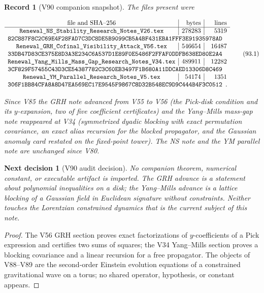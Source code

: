 \documentclass[11pt]{article}
\newtheorem{decision}[theorem]{Next decision}
\newtheorem{record}[theorem]{Record}
\theoremstyle{remark}
\begin{document}
\begin{record}[V90 companion snapshot]
\label{rec:v19v90-snapshot}
The files present were

\[
\begin{array}{c|r|r}
\hbox{file and SHA--256}&\hbox{bytes}&\hbox{lines}\\ \hline
\texttt{Renewal\_NS\_Stability\_Research\_Notes\_V26.tex}
&278283&5319\\
\multicolumn{3}{l}{
\texttt{82C887F8C2C69E4F28FAD7C3DC8DE5B9099CB5A4BF431EBA1FFF3E91935978AD}}
\\
\texttt{Renewal\_GRH\_Cofinal\_Visibility\_Attack\_V56.tex}
&546654&16487\\
\multicolumn{3}{l}{
\texttt{33DB47D83CE375E8D3A3E234C6A537D1E89F0E5486F2FFAF0DDFB638ED80E2A4}}
\\
\texttt{Renewal\_Yang\_Mills\_Mass\_Gap\_Research\_Notes\_V34.tex}
&489911&12282\\
\multicolumn{3}{l}{
\texttt{3CF829F57455C43D3CE54387782C3C60EB3497F1B680A11DDCAED13306D8C469}}
\\
\texttt{Renewal\_YM\_Parallel\_Research\_Notes\_V5.tex}
&54174&1351\\
\multicolumn{3}{l}{
\texttt{306F1BB84CFA8A8D47EA569EC17E9545F9867C8D32B548EC9D9C444B4F3C0512}}.
\end{array}                                                     \tag{93.1}
\]

Since V85 the GRH note advanced from V55 to V56 (the Pick-disk
condition and its \(y\)-expansion, two of five coefficient
certificates) and the Yang--Mills mass-gap note reappeared at V34
(symmetrized dyadic blocking with exact permutation covariance, an
exact alias recursion for the blocked propagator, and the Gaussian
anomaly card restated on the fixed-point tower).  The NS note and the
YM parallel note are unchanged since V80.
\end{record}

\begin{decision}[V90 audit decision]
\label{dec:v19v90-audit}
No companion theorem, numerical constant, or executable artifact is
imported.  The GRH advance is a statement about polynomial
inequalities on a disk; the Yang--Mills advance is a lattice blocking
of a Gaussian field in Euclidean signature without constraints.
Neither touches the Lorentzian constrained dynamics that is the
current subject of this note.
\end{decision}

\begin{proof}
The V56 GRH section proves exact factorizations of \(y\)-coefficients
of a Pick expression and certifies two sums of squares; the V34
Yang--Mills section proves a blocking covariance and a linear
recursion for a free propagator.  The objects of V88--V89 are the
second-order Einstein evolution equations of a constrained
gravitational wave on a torus; no shared operator, hypothesis, or
constant appears.
\end{proof}
\end{document}
